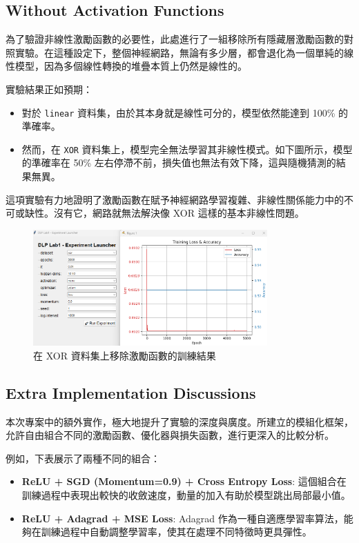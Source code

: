 \documentclass{article}
\begin{document}
\subsection{Without Activation Functions}
為了驗證非線性激勵函數的必要性，此處進行了一組移除所有隱藏層激勵函數的對照實驗。在這種設定下，整個神經網路，無論有多少層，都會退化為一個單純的線性模型，因為多個線性轉換的堆疊本質上仍然是線性的。

實驗結果正如預期：
\begin{itemize}
    \item 對於 \texttt{linear} 資料集，由於其本身就是線性可分的，模型依然能達到 100\% 的準確率。
    \item 然而，在 \texttt{XOR} 資料集上，模型完全無法學習其非線性模式。如下圖所示，模型的準確率在 50\% 左右停滯不前，損失值也無法有效下降，這與隨機猜測的結果無異。
\end{itemize}
這項實驗有力地證明了激勵函數在賦予神經網路學習複雜、非線性關係能力中的不可或缺性。沒有它，網路就無法解決像 XOR 這樣的基本非線性問題。

\begin{figure}[h!]
    \centering
    \includegraphics[width=0.8\textwidth]{Lab01_report/img/4.3.png}
    \caption{在 XOR 資料集上移除激勵函數的訓練結果}
    \label{fig:no_activation}
\end{figure}

\subsection{Extra Implementation Discussions}
本次專案中的額外實作，極大地提升了實驗的深度與廣度。所建立的模組化框架，允許自由組合不同的激勵函數、優化器與損失函數，進行更深入的比較分析。

例如，下表展示了兩種不同的組合：
\begin{itemize}
    \item \textbf{ReLU + SGD (Momentum=0.9) + Cross Entropy Loss}: 這個組合在訓練過程中表現出較快的收斂速度，動量的加入有助於模型跳出局部最小值。
    \item \textbf{ReLU + Adagrad + MSE Loss}: Adagrad 作為一種自適應學習率算法，能夠在訓練過程中自動調整學習率，使其在處理不同特徵時更具彈性。
\end{itemize}
\end{document}
